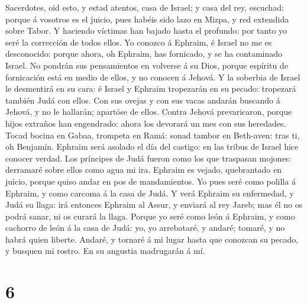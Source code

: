  Sacerdotes, oid esto, y estad atentos, casa de Israel; y
casa del rey, escuchad: porque á vosotros es el juicio, pues habéis sido
lazo en Mizpa, y red extendida sobre Tabor.  Y haciendo
víctimas han bajado hasta el profundo: por tanto yo seré la corrección
de todos ellos.  Yo conozco á Ephraim, é Israel no me es
desconocido: porque ahora, oh Ephraim, has fornicado, y se ha
contaminado Israel.  No pondrán sus pensamientos en volverse
á su Dios, porque espíritu de fornicación está en medio de ellos, y no
conocen á Jehová.  Y la soberbia de Israel le desmentirá en
su cara: é Israel y Ephraim tropezarán en su pecado: tropezará también
Judá con ellos.  Con sus ovejas y con sus vacas andarán
buscando á Jehová, y no le hallarán; apartóse de ellos. 
Contra Jehová prevaricaron, porque hijos extraños han engendrado: ahora
los devorará un mes con sus heredades.  Tocad bocina en
Gabaa, trompeta en Ramá: sonad tambor en Beth-aven: tras ti, oh
Benjamín.  Ephraim será asolado el día del castigo: en las
tribus de Israel hice conocer verdad.  Los príncipes de
Judá fueron como los que traspasan mojones: derramaré sobre ellos como
agua mi ira.  Ephraim es vejado, quebrantado en juicio,
porque quiso andar en pos de mandamientos.  Yo pues seré
como polilla á Ephraim, y como carcoma á la casa de Judá. 
Y verá Ephraim su enfermedad, y Judá su llaga: irá entonces Ephraim al
Assur, y enviará al rey Jareb; mas él no os podrá sanar, ni os curará la
llaga.  Porque yo seré como león á Ephraim, y como cachorro
de león á la casa de Judá: yo, yo arrebataré, y andaré; tomaré, y no
habrá quien liberte.  Andaré, y tornaré á mi lugar hasta
que conozcan su pecado, y busquen mi rostro. En su angustia madrugarán á
mí.

\hypertarget{section-5}{%
\section{6}\label{section-5}}

